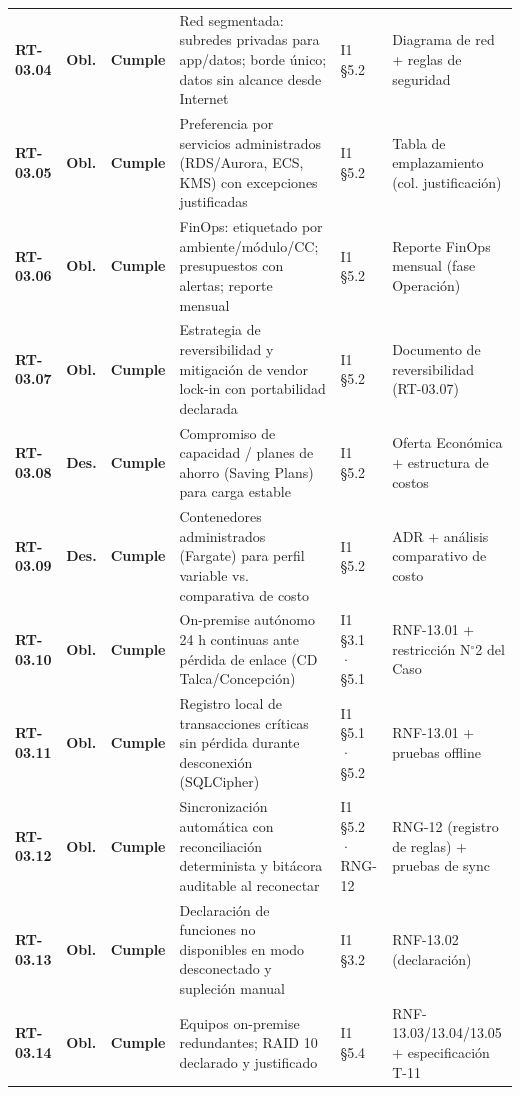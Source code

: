 \begin{small}
\begin{longtable}{@{}p{1.35cm} p{1.15cm} p{1.15cm} p{4.6cm} p{2.35cm} p{3.8cm}@{}}
\textbf{RT-03.04} & \textbf{Obl.} & \textbf{Cumple} & Red segmentada: subredes privadas para app/datos; borde \'unico; datos sin alcance desde Internet & I1 §5.2 & Diagrama de red + reglas de seguridad \\
\textbf{RT-03.05} & \textbf{Obl.} & \textbf{Cumple} & Preferencia por servicios administrados (RDS/Aurora, ECS, KMS) con excepciones justificadas & I1 §5.2 & Tabla de emplazamiento (col. justificaci\'on) \\
\textbf{RT-03.06} & \textbf{Obl.} & \textbf{Cumple} & FinOps: etiquetado por ambiente/m\'odulo/CC; presupuestos con alertas; reporte mensual & I1 §5.2 & Reporte FinOps mensual (fase Operaci\'on) \\
\textbf{RT-03.07} & \textbf{Obl.} & \textbf{Cumple} & Estrategia de reversibilidad y mitigaci\'on de vendor lock-in con portabilidad declarada & I1 §5.2 & Documento de reversibilidad (RT-03.07) \\
\textbf{RT-03.08} & \textbf{Des.} & \textbf{Cumple} & Compromiso de capacidad / planes de ahorro (Saving Plans) para carga estable & I1 §5.2 & Oferta Econ\'omica + estructura de costos \\
\textbf{RT-03.09} & \textbf{Des.} & \textbf{Cumple} & Contenedores administrados (Fargate) para perfil variable vs. comparativa de costo & I1 §5.2 & ADR + an\'alisis comparativo de costo \\
\textbf{RT-03.10} & \textbf{Obl.} & \textbf{Cumple} & On-premise aut\'onomo 24 h continuas ante p\'erdida de enlace (CD Talca/Concepci\'on) & I1 §3.1 · §5.1 & RNF-13.01 + restricci\'on N$^{\circ}$2 del Caso \\
\textbf{RT-03.11} & \textbf{Obl.} & \textbf{Cumple} & Registro local de transacciones cr\'iticas sin p\'erdida durante desconexi\'on (SQLCipher) & I1 §5.1 · §5.2 & RNF-13.01 + pruebas offline \\
\textbf{RT-03.12} & \textbf{Obl.} & \textbf{Cumple} & Sincronizaci\'on autom\'atica con reconciliaci\'on determinista y bit\'acora auditable al reconectar & I1 §5.2 · RNG-12 & RNG-12 (registro de reglas) + pruebas de sync \\
\textbf{RT-03.13} & \textbf{Obl.} & \textbf{Cumple} & Declaraci\'on de funciones no disponibles en modo desconectado y supleci\'on manual & I1 §3.2 & RNF-13.02 (declaraci\'on) \\
\textbf{RT-03.14} & \textbf{Obl.} & \textbf{Cumple} & Equipos on-premise redundantes; RAID 10 declarado y justificado & I1 §5.4 & RNF-13.03/13.04/13.05 + especificaci\'on T-11 \\

\end{longtable}
\end{small}
